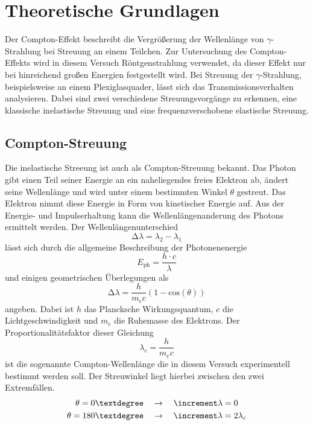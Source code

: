 \section{Theoretische Grundlagen}
Der Compton-Effekt beschreibt die Vergrößerung der Wellenlänge von $\gamma$-Strahlung bei Streuung an einem Teilchen. Zur Untersuchung
des Compton-Effekts wird in diesem Versuch Röntgenstrahlung verwendet, da dieser Effekt nur bei hinreichend großen Energien festgestellt wird.
Bei Streuung der $\gamma$-Strahlung, beispielsweise an einem Plexiglasquader, lässt sich das Transmissionsverhalten analysieren. Dabei
sind zwei verschiedene Streuungsvorgänge zu erkennen, eine klassische inelastische Streuung und eine frequenzverschobene elastische Streuung.
\\
\subsection{Compton-Streuung}
Die inelastische Streeung ist auch als Compton-Streuung bekannt. Das Photon gibt einen Teil seiner Energie an ein naheliegendes freies Elektron ab, ändert seine Wellenlänge und wird unter einem 
bestimmten Winkel $\theta$ gestreut. Das Elektron nimmt diese Energie in Form von kinetischer Energie auf. Aus der Energie- und Impulserhaltung kann die Wellenlängenanderung des Photons ermittelt werden.
Der Wellenlängenunterschied
\begin{equation*}
\increment \lambda = \lambda_{2} - \lambda_{1}
\end{equation*}
lässt sich durch die allgemeine Beschreibung der Photonenenergie
\begin{equation}
\label{eqn:photoneneq}
E_{\text{ph}} = \frac{h \cdot c}{\lambda}
\end{equation}
und einigen geometrischen Überlegungen als
\begin{equation}
\increment \lambda = \frac{h}{m_{e} c}(1-\text{cos}(\theta))
\end{equation}
angeben. Dabei ist $h$ das Plancksche Wirkungsquantum, $c$ die Lichtgeschwindigkeit und $m_{e}$ die Ruhemasse des Elektrons.
Der Proportionalitätsfaktor dieser Gleichung
\begin{equation}
\label{eqn:comptonwavelength}
\lambda_{c} = \frac{h}{m_{e} c}
\end{equation}
ist die sogenannte Compton-Wellenlänge die in diesem Versuch experimentell bestimmt werden soll. Der Streuwinkel liegt hierbei zwischen den
zwei Extremfällen. 
\begin{align*}
\theta = 0\textdegree \quad &\to \quad \increment \lambda = 0 \\
\theta = 180\textdegree \quad &\to \quad \increment \lambda = 2 \lambda_{c}
\end{align*}
